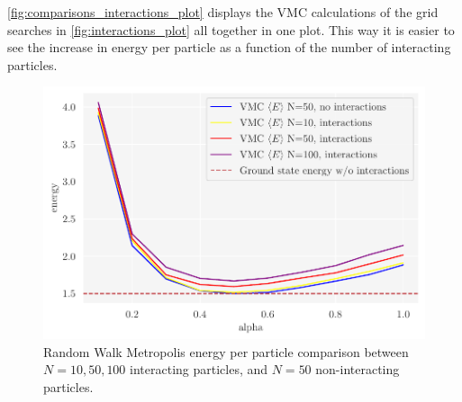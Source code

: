 \autoref{fig:comparisons_interactions_plot} displays the VMC calculations of the grid searches in \autoref{fig:interactions_plot} all together in one plot. This way it is easier to see the increase in energy per particle as a function of the number of interacting particles. 

\begin{figure}[H]
\begin{center}\includegraphics[scale=1.0]{latex/figures/grid_search_analytical_w_interactions_all_N.pdf}
\end{center}
\caption{Random Walk Metropolis energy per particle comparison between $N=10, 50, 100$ interacting particles, and $N=50$ non-interacting particles.}
\label{fig:comparisons_interactions_plot}
\end{figure}

